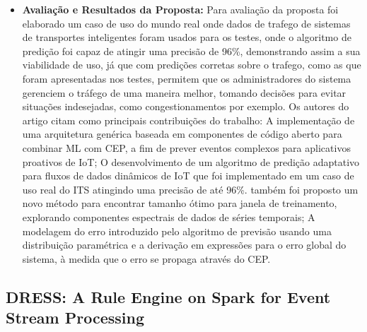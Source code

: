 \documentclass[tid,table]{texufpel} %
\begin{document}
\begin{itemize}
	 \item \textbf{Avaliação e Resultados da Proposta:}
	 Para avaliação da proposta foi elaborado um caso de uso do mundo real onde dados de trafego de sistemas de transportes inteligentes foram usados para os testes, onde o algoritmo de predição foi capaz de atingir uma precisão de 96\%, demonstrando assim a sua viabilidade de uso, já que com predições corretas sobre o trafego, como as que foram apresentadas nos testes, permitem que os administradores do sistema gerenciem o tráfego de uma maneira melhor, tomando decisões para evitar situações indesejadas, como congestionamentos por exemplo.	 
	 Os autores do artigo citam como principais contribuições do trabalho:
	 A implementação de uma arquitetura genérica baseada em componentes de código aberto para combinar ML com CEP, a fim de prever eventos complexos para aplicativos proativos de IoT;
	 O desenvolvimento de um algoritmo de predição adaptativo para fluxos de dados dinâmicos de IoT que foi implementado em um caso de uso real do ITS atingindo uma precisão de até 96\%. também foi proposto um novo método para encontrar tamanho ótimo para janela de treinamento, explorando componentes espectrais de dados de séries temporais;
	 A modelagem do erro introduzido pelo algoritmo de previsão usando uma distribuição paramétrica e a derivação em expressões para o erro global do sistema, à medida que o erro se propaga através do CEP.
\end{itemize}


\subsection{DRESS: A Rule Engine on Spark for Event Stream Processing}
\end{document}
